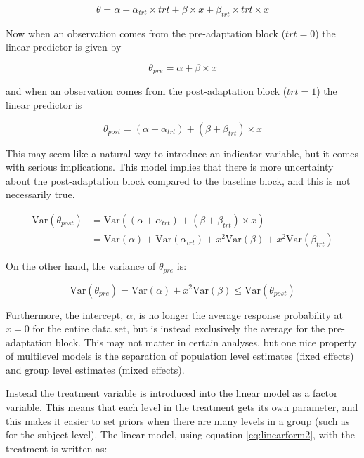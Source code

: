 \documentclass[11pt, oneside, openany]{scrbook}
\begin{document}

\[\theta = \alpha + \alpha_{trt} \times trt + \beta \times x + \beta_{trt}\times trt \times x\]

Now when an observation comes from the pre-adaptation block (\(trt=0\)) the linear predictor is given by


\[\theta_{pre} = \alpha + \beta \times x\]

and when an observation comes from the post-adaptation block (\(trt=1\)) the linear predictor is


\[\theta_{post} = (\alpha + \alpha_{trt}) + (\beta + \beta_{trt}) \times x\]

This may seem like a natural way to introduce an indicator variable, but it comes with serious implications. This model implies that there is more uncertainty about the post-adaptation block compared to the baseline block, and this is not necessarily true.


\begin{align*}
\mathrm{Var}(\theta_{post}) &= \mathrm{Var}((\alpha + \alpha_{trt}) + (\beta + \beta_{trt}) \times x) \\
&= \mathrm{Var}(\alpha) + \mathrm{Var}(\alpha_{trt}) + x^2 \mathrm{Var}(\beta) + x^2\mathrm{Var}(\beta_{trt})
\end{align*}

On the other hand, the variance of \(\theta_{pre}\) is:


\[
\mathrm{Var}(\theta_{pre}) = \mathrm{Var}(\alpha) + x^2 \mathrm{Var}(\beta) \le \mathrm{Var}(\theta_{post})
\]

Furthermore, the intercept, \(\alpha\), is no longer the average response probability at \(x=0\) for the entire data set, but is instead exclusively the average for the pre-adaptation block. This may not matter in certain analyses, but one nice property of multilevel models is the separation of population level estimates (fixed effects) and group level estimates (mixed effects).

Instead the treatment variable is introduced into the linear model as a factor variable. This means that each level in the treatment gets its own parameter, and this makes it easier to set priors when there are many levels in a group (such as for the subject level). The linear model, using equation \eqref{eq:linearform2}, with the treatment is written as:
\end{document}
